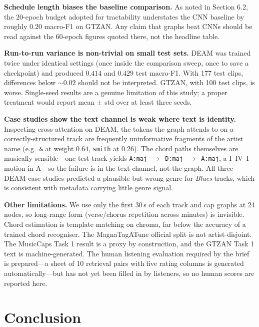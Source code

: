 \documentclass{article}
\begin{document}
\textbf{Schedule length biases the baseline comparison.} As noted in
Section 6.2, the $20$-epoch budget adopted for tractability understates the CNN
baseline by roughly $0.20$ macro-F1 on GTZAN. Any claim that graphs beat CNNs
should be read against the $60$-epoch figures quoted there, not the headline
table.

\textbf{Run-to-run variance is non-trivial on small test sets.} DEAM was trained
twice under identical settings (once inside the comparison sweep, once to save a
checkpoint) and produced $0.414$ and $0.429$ test macro-F1. With 177 test clips,
differences below $\sim\!0.02$ should not be interpreted. GTZAN, with 100 test
clips, is worse. Single-seed results are a genuine limitation of this study; a
proper treatment would report mean $\pm$ std over at least three seeds.

\textbf{Case studies show the text channel is weak where text is identity.}
Inspecting cross-attention on DEAM, the tokens the graph attends to on a
correctly-structured track are frequently uninformative fragments of the artist
name (e.g.\ \texttt{\&} at weight $0.64$, \texttt{smith} at $0.26$). The chord
paths themselves are musically sensible---one test track yields
\texttt{A:maj $\rightarrow$ D:maj $\rightarrow$ A:maj}, a I--IV--I motion in
A---so the failure is in the text channel, not the graph. All three DEAM case
studies predicted a plausible but wrong genre for \emph{Blues} tracks, which is
consistent with metadata carrying little genre signal.

\textbf{Other limitations.} We use only the first $30$\,s of each track and cap
graphs at 24 nodes, so long-range form (verse/chorus repetition across minutes) is
invisible. Chord estimation is template matching on chroma, far below the accuracy
of a trained chord recogniser. The MagnaTagATune official split is not
artist-disjoint. The MusicCaps Task 1 result is a proxy by construction, and the
GTZAN Task 1 text is machine-generated. The human listening evaluation required by
the brief is prepared---a sheet of 10 retrieval pairs with five rating columns is
generated automatically---but has not yet been filled in by listeners, so no human
scores are reported here.

\section{Conclusion}
\end{document}
